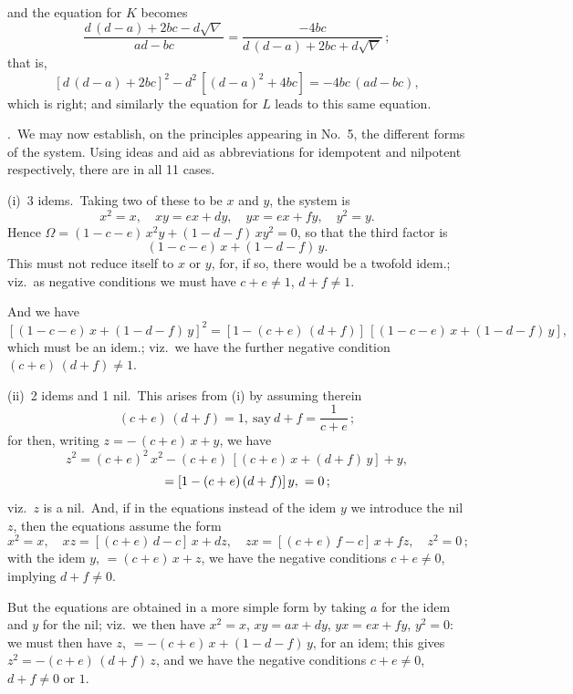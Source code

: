 \documentclass[11pt,a4paper]{article}
\providecommand{\textsc}[1]{{\scshape #1}}
\begin{document}
\thispagestyle{plain}
\noindent and the equation for $K$ becomes
\[
\frac{d\,(d - a) + 2bc - d\sqrt{\nabla}}{ad - bc} = \frac{-4bc}{d\,(d - a) + 2bc + d\sqrt{\nabla}}\,;
\]
that is,
\[
[d\,(d - a) + 2bc]^{2} - d^{2}\,[(d - a)^{2} + 4bc] = -4bc\,(ad - bc),
\]
which is right; and similarly the equation for $L$ leads to this same equation.

.\ We may now establish, on the principles appearing in No.~5, the different forms of the system.  Using ideas and aid as abbreviations for idempotent and nilpotent respectively, there are in all 11 cases.

\medskip
(i)\ 3 idems.\ Taking two of these to be $x$ and $y$, the system is
\[
x^{2} = x,\quad xy = ex + dy,\quad yx = ex + fy,\quad y^{2} = y.
\]
Hence $\Omega = (1 - c - e)\,x^{2}y + (1 - d - f)\,xy^{2} = 0$, so that the third factor is
\[
(1 - c - e)\,x + (1 - d - f)\,y.
\]
This must not reduce itself to $x$ or $y$, for, if so, there would be a twofold idem.; viz.\ as negative conditions we must have $c + e \neq 1$, $d + f \neq 1$.

\medskip
And we have
\[
[(1 - c - e)\,x + (1 - d - f)\,y]^{2} = [1 - (c + e)\,(d + f)]\,[(1 - c - e)\,x + (1 - d - f)\,y],
\]
which must be an idem.; viz.\ we have the further negative condition $(c + e)\,(d + f) \neq 1$.

\medskip
(ii)\ 2 idems and 1 nil.\ This arises from (i) by assuming therein
\[
(c + e)\,(d + f) = 1,\ \text{say}\ d + f = \frac{1}{c + e}\,;
\]
for then, writing $z = -\,(c + e)\,x + y$, we have
\[
z^{2} = (c + e)^{2}\,x^{2} - (c + e)\,[(c + e)\,x + (d + f)\,y] + y,
\]
\[
\hspace{1.6em} = [1 - (c + e)\,(d + f)]\,y,\ = 0\,;
\]
viz.\ $z$ is a nil.\ And, if in the equations instead of the idem $y$ we introduce the nil $z$, then the equations assume the form
\[
x^{2} = x,\quad xz = [(c + e)\,d - c]\,x + dz,\quad zx = [(c + e)\,f - c]\,x + fz,\quad z^{2} = 0\,;
\]
with the idem $y$, $= (c + e)\,x + z$, we have the negative conditions $c + e \neq 0$, implying $d + f \neq 0$.

\medskip
But the equations are obtained in a more simple form by taking $a$ for the idem and $y$ for the nil; viz.\ we then have $x^{2} = x$, $xy = ax + dy$, $yx = ex + fy$, $y^{2} = 0$: we must then have $z$, $= -(c + e)\,x + (1 - d - f)\,y$, for an idem; this gives $z^{2} = -(c + e)\,(d + f)\,z$, and we have the negative conditions $c + e \neq 0$, $d + f \neq 0$ or $1$.
\clearpage

\fancyhead[L]{\small 814]}
\fancyhead[C]{\small\textsc{on double algebra.}}
\end{document}
